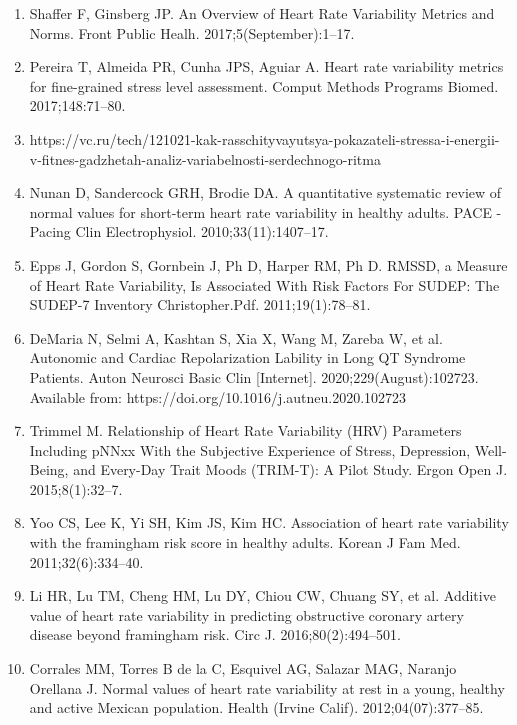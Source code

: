 \documentclass[9pt,twocolumn,twoside,lineno]{gsajnl}
\begin{document}
\begin{enumerate}

\item \label{metrics}
Shaffer F, Ginsberg JP. An Overview of Heart Rate Variability Metrics and Norms. Front Public Healh. 2017;5(September):1–17. 

\item \label{fine_stress}
Pereira T, Almeida PR, Cunha JPS, Aguiar A. Heart rate variability metrics for fine-grained stress level assessment. Comput Methods Programs Biomed. 2017;148:71–80. 

\item \label{given_article}
https://vc.ru/tech/121021-kak-rasschityvayutsya-pokazateli-stressa-i-energii-v-fitnes-gadzhetah-analiz-variabelnosti-serdechnogo-ritma

\item \label{healthy_adults}
Nunan D, Sandercock GRH, Brodie DA. A quantitative systematic review of normal values for short-term heart rate variability in healthy adults. PACE - Pacing Clin Electrophysiol. 2010;33(11):1407–17. 

\item \label{epilepsy}
Epps J, Gordon S, Gornbein J, Ph D, Harper RM, Ph D. RMSSD, a Measure of Heart Rate Variability, Is Associated With Risk Factors For SUDEP: The SUDEP-7 Inventory Christopher.Pdf. 2011;19(1):78–81. 

\item \label{LQTS}
DeMaria N, Selmi A, Kashtan S, Xia X, Wang M, Zareba W, et al. Autonomic and Cardiac Repolarization Lability in Long QT Syndrome Patients. Auton Neurosci Basic Clin [Internet]. 2020;229(August):102723. Available from: https://doi.org/10.1016/j.autneu.2020.102723

\item \label{table}
Trimmel M. Relationship of Heart Rate Variability (HRV) Parameters Including pNNxx With the Subjective Experience of Stress, Depression, Well-Being, and Every-Day Trait Moods (TRIM-T): A Pilot Study. Ergon Open J. 2015;8(1):32–7. 

\item \label{chd}
Yoo CS, Lee K, Yi SH, Kim JS, Kim HC. Association of heart rate variability with the framingham risk score in healthy adults. Korean J Fam Med. 2011;32(6):334–40.

\item \label{cad}
Li HR, Lu TM, Cheng HM, Lu DY, Chiou CW, Chuang SY, et al. Additive value of heart rate variability in predicting obstructive coronary artery disease beyond framingham risk. Circ J. 2016;80(2):494–501. 

\item \label{pnn20}
Corrales MM, Torres B de la C, Esquivel AG, Salazar MAG, Naranjo Orellana J. Normal values of heart rate variability at rest in a young, healthy and active Mexican population. Health (Irvine Calif). 2012;04(07):377–85. 

\end{enumerate}
\end{document}
